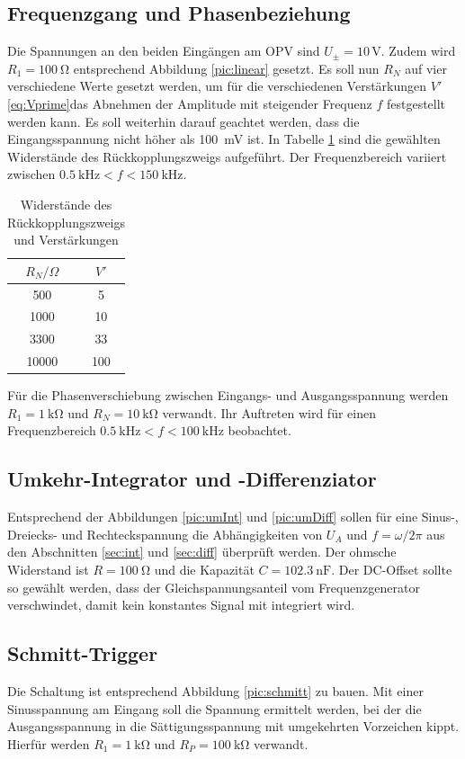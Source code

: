 \subsection{Frequenzgang und Phasenbeziehung}
Die Spannungen an den beiden Eingängen am OPV sind $U_\pm = 10$\,V.
Zudem wird $R_1 = \SI{100}{\ohm}$ entsprechend Abbildung \ref{pic:linear}
gesetzt. Es soll nun $R_N$ auf vier verschiedene Werte gesetzt werden, 
um für die verschiedenen Verstärkungen $V'$ \eqref{eq:Vprime}das 
Abnehmen der Amplitude
mit steigender Frequenz $f$ festgestellt werden kann. Es soll weiterhin
darauf geachtet werden, dass die Eingangsspannung nicht höher als
\SI{100}{\milli\volt} ist. In Tabelle \ref{tab:verstaerkungen} sind
die gewählten Widerstände des Rückkopplungszweigs aufgeführt. Der
Frequenzbereich variiert zwischen $\SI{0.5}{\kilo\hertz} < f < \SI{150}{\kilo\hertz}$.
\begin{table}[b]
 \begin{tabular}{c|c}
  $R_N/\Omega$ & $V'$\\
  \hline
  500 & 5\\
  1000 & 10 \\
  3300 & 33 \\
  10000 & 100
 \end{tabular}
 \caption{Widerstände des Rückkopplungszweigs und Verstärkungen}
\label{tab:verstaerkungen}
\end{table}
Für die Phasenverschiebung zwischen Eingangs- und Ausgangsspannung
werden $R_1 = \SI{1}{\kilo\ohm}$ und $R_N = \SI{10}{\kilo\ohm}$ 
verwandt. Ihr Auftreten wird für einen Frequenzbereich 
$\SI{0.5}{\kilo\hertz} < f < \SI{100}{\kilo\hertz}$ beobachtet.

\subsection{Umkehr-Integrator und -Differenziator}
Entsprechend der Abbildungen \ref{pic:umInt} und \ref{pic:umDiff}
sollen für eine Sinus-, Dreiecks- und Rechteckspannung die Abhängigkeiten
von $U_A$ und $f=\omega/2\pi$ aus den Abschnitten \ref{sec:int} und
\ref{sec:diff} überprüft werden. Der ohmsche Widerstand ist
$R = \SI{100}{\ohm}$ und die Kapazität $C = \SI{102,3}{\nano\farad}$.
Der DC-Offset sollte so gewählt werden, dass der Gleichspannungsanteil
vom Frequenzgenerator verschwindet, damit kein konstantes Signal
mit integriert wird.

\subsection{Schmitt-Trigger}
Die Schaltung ist entsprechend Abbildung \ref{pic:schmitt} zu bauen.
Mit einer Sinusspannung am Eingang soll die Spannung ermittelt werden,
bei der die Ausgangsspannung in die Sättigungsspannung mit umgekehrten
Vorzeichen kippt. Hierfür werden $R_1 = \SI{1}{\kilo\ohm}$ und
$R_P = \SI{100}{\kilo\ohm}$ verwandt.

